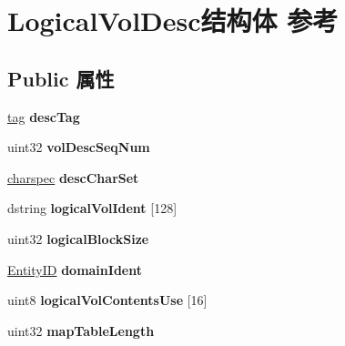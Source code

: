 \hypertarget{struct_logical_vol_desc}{}\section{Logical\+Vol\+Desc结构体 参考}
\label{struct_logical_vol_desc}
\subsection*{Public 属性}
\begin{DoxyCompactItemize}
\item 
\mbox{\label{struct_logical_vol_desc_a2e31e51e3b9c70771e285c0df686e437}} 
\hyperlink{structtag}{tag} {\bfseries desc\+Tag}
\item 
\mbox{\label{struct_logical_vol_desc_ad0be6c3a2b3f888dc8aff2ee22925b8e}} 
uint32 {\bfseries vol\+Desc\+Seq\+Num}
\item 
\mbox{\label{struct_logical_vol_desc_a807a146c17d8643cf207f30608c1dde4}} 
\hyperlink{structcharspec}{charspec} {\bfseries desc\+Char\+Set}
\item 
\mbox{\label{struct_logical_vol_desc_ab9ce77f614ce4554d436dce1de6eb934}} 
dstring {\bfseries logical\+Vol\+Ident} \mbox{[}128\mbox{]}
\item 
\mbox{\label{struct_logical_vol_desc_a692cd075661bd61cfcca2fb6bef2a3c2}} 
uint32 {\bfseries logical\+Block\+Size}
\item 
\mbox{\label{struct_logical_vol_desc_a54d09b9a2e88ab98dc00542efbb22a6b}} 
\hyperlink{struct_entity_i_d}{Entity\+ID} {\bfseries domain\+Ident}
\item 
\mbox{\label{struct_logical_vol_desc_a4a890b3638c2c1c29b85d7c539a54454}} 
uint8 {\bfseries logical\+Vol\+Contents\+Use} \mbox{[}16\mbox{]}
\item 
\mbox{\label{struct_logical_vol_desc_a16a8b28747ead27d6c4b90fc26e3076a}} 
uint32 {\bfseries map\+Table\+Length}
\item 
\mbox{\label{struct_logical_vol_desc_a04b8183ab3937eed83cfa2dd186830da}} 

\end{DoxyCompactItemize}
